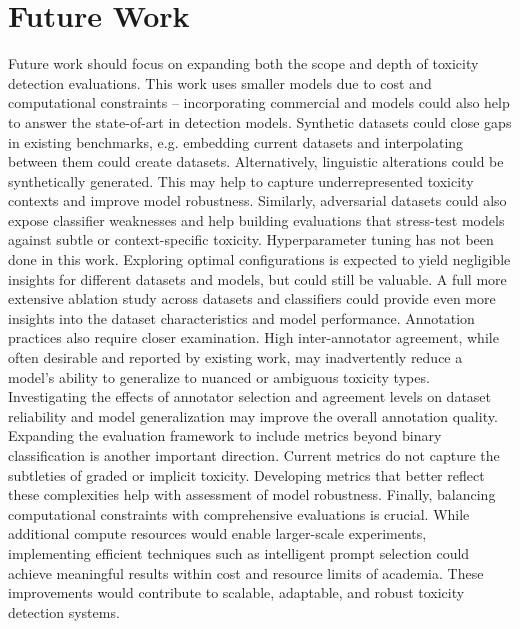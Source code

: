 \section{Future Work}
Future work should focus on expanding both the scope and depth of toxicity detection evaluations. This work uses smaller models due to cost and computational constraints -- incorporating commercial and models could also help to answer the state-of-art in detection models.\newline
Synthetic datasets could close gaps in existing benchmarks, e.g. embedding current datasets and interpolating between them could create datasets. Alternatively, linguistic alterations could be synthetically generated. This may help to capture underrepresented toxicity contexts and improve model robustness. Similarly, adversarial datasets could also expose classifier weaknesses and help building evaluations that stress-test models against subtle or context-specific toxicity.\newline
Hyperparameter tuning has not been done in this work. Exploring optimal configurations is expected to yield negligible insights for different datasets and models, but could still be valuable. A full more extensive ablation study across datasets and classifiers could provide even more insights into the dataset characteristics and model performance.\newline
Annotation practices also require closer examination. High inter-annotator agreement, while often desirable and reported by existing work, may inadvertently reduce a model's ability to generalize to nuanced or ambiguous toxicity types. Investigating the effects of annotator selection and agreement levels on dataset reliability and model generalization may improve the overall annotation quality.\newline
Expanding the evaluation framework to include metrics beyond binary classification is another important direction. Current metrics do not capture the subtleties of graded or implicit toxicity. Developing metrics that better reflect these complexities help with assessment of model robustness.\newline
Finally, balancing computational constraints with comprehensive evaluations is crucial. While additional compute resources would enable larger-scale experiments, implementing efficient techniques such as intelligent prompt selection could achieve meaningful results within cost and resource limits of academia. These improvements would contribute to  scalable, adaptable, and robust toxicity detection systems.